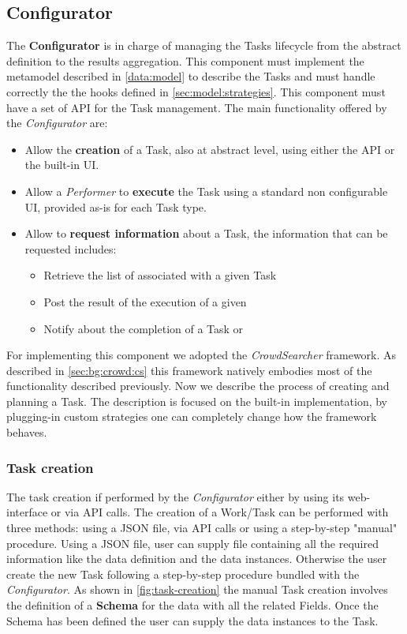 \subsection{Configurator}\label{sec:configurator}
The \textbf{Configurator} is in charge of managing the Tasks lifecycle
from the abstract definition to the results aggregation. This component must
implement the metamodel described in \ref{data:model} to describe the Tasks and
must handle correctly the the hooks defined in \ref{sec:model:strategies}. This
component must have a set of API for the Task management.
The main functionality offered by the \emph{Configurator} are:
\begin{itemize}
    \item Allow the \textbf{creation} of a Task, also at abstract level, using
    either the API or the built-in UI.

    \item Allow a \emph{Performer} to \textbf{execute} the Task using a standard
    non configurable UI, provided as-is for each Task type.

    \item Allow to \textbf{request information} about a Task, the information
    that can be requested includes:
    \begin{itemize}
        \item Retrieve the list of \utask{} associated with a given Task

        \item Post the result of the execution of a given \utask{}

        \item Notify about the completion of a Task or \utask{}
    \end{itemize}
\end{itemize}

\noindent For implementing this component we adopted the \emph{CrowdSearcher} framework.
As described in \ref{sec:bg:crowd:cs} this framework natively embodies most of
the functionality described previously. Now we describe the process of creating
and planning a Task. The description is focused on the built-in implementation,
by plugging-in custom strategies one can completely change how the framework behaves.

\subsubsection{Task creation}
The task creation if performed by the \emph{Configurator} either by using its
web-interface or via API calls. The creation of a Work/Task can be performed with
three methods: using a JSON file, via API calls or using a step-by-step "manual" procedure.
Using a JSON file, user can supply file containing all the required information like
the data definition and the data instances.
Otherwise the user create the new Task following a step-by-step procedure bundled
with the \emph{Configurator}. As shown in \autoref{fig:task-creation} the manual Task
creation involves the definition of a \textbf{Schema} for the data with all the
related Fields. Once the Schema has been defined the user can supply the data
instances to the Task.

